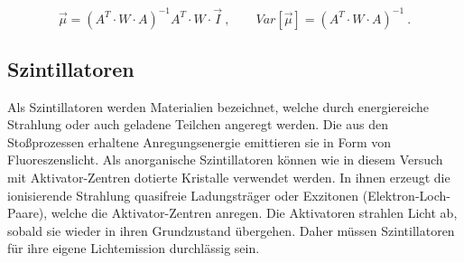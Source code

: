 \vspace{-5pt}
\begin{equation}
    \vec{\mu} = \left(A^T \cdot W \cdot A\right)^{-1} A^T \cdot W \cdot \vec{I}\:, \qquad Var[\vec{\mu}] = \left(A^T \cdot W \cdot A\right)^{-1} \: .
    \label{eqn:Abs}
\end{equation}

\subsection{Szintillatoren}

Als Szintillatoren werden Materialien bezeichnet, welche durch energiereiche Strahlung oder auch geladene Teilchen angeregt werden.
Die aus den Stoßprozessen erhaltene Anregungsenergie emittieren sie in Form von Fluoreszenslicht.
Als anorganische Szintillatoren können wie in diesem Versuch mit Aktivator-Zentren dotierte Kristalle verwendet werden.
In ihnen erzeugt die ionisierende Strahlung quasifreie Ladungsträger oder Exzitonen (Elektron-Loch-Paare),
welche die Aktivator-Zentren anregen. Die Aktivatoren strahlen Licht ab, sobald sie wieder in ihren Grundzustand übergehen.
Daher müssen Szintillatoren für ihre eigene Lichtemission durchlässig sein.
